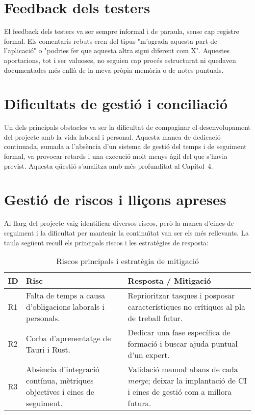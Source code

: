 \section{Feedback dels testers}

El feedback dels testers va ser sempre informal i de paraula, sense cap registre formal. Els comentaris rebuts eren del tipus "m'agrada aquesta part de l'aplicació" o "podries fer que aquesta altra sigui diferent com X". Aquestes aportacions, tot i ser valuoses, no seguien cap procés estructurat ni quedaven documentades més enllà de la meva pròpia memòria o de notes puntuals.

\section{Dificultats de gestió i conciliació}

Un dels principals obstacles va ser la dificultat de compaginar el desenvolupament del projecte amb la vida laboral i personal. Aquesta manca de dedicació continuada, sumada a l'absència d'un sistema de gestió del temps i de seguiment formal, va provocar retards i una execució molt menys àgil del que s'havia previst. Aquesta qüestió s'analitza amb més profunditat al Capítol~4.

\section{Gestió de riscos i lliçons apreses}

Al llarg del projecte vaig identificar diversos riscos, però la manca d'eines de seguiment i la dificultat per mantenir la continuïtat van ser els més rellevants. La taula següent recull els principals riscos i les estratègies de resposta:

\begin{table}[h]
  \centering
  \caption{Riscos principals i estratègia de mitigació}
  \label{tab:riesgos}
  \begin{tabular}{@{}p{0.7cm}p{6.8cm}p{6.8cm}@{}}
    \toprule
    \textbf{ID} & \textbf{Risc} & \textbf{Resposta / Mitigació} \\
    \midrule
    R1 & Falta de temps a causa d'obligacions laborals i personals. & Reprioritzar tasques i posposar característiques no crítiques al pla de treball futur. \\
    R2 & Corba d'aprenentatge de Tauri i Rust. & Dedicar una fase específica de formació i buscar ajuda puntual d'un expert. \\
    R3 & Absència d'integració contínua, mètriques objectives i eines de seguiment. & Validació manual abans de cada \textit{merge}; deixar la implantació de CI i eines de gestió com a millora futura. \\
    \bottomrule
  \end{tabular}
\end{table}

